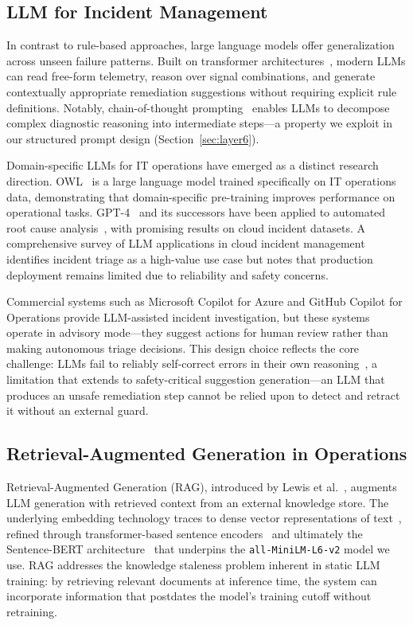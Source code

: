 \documentclass[a4paper,10pt,journal,compsoc]{IEEEtran}
\begin{document}
\subsection{LLM for Incident Management}

In contrast to rule-based approaches, large language models offer
generalization across unseen failure patterns. Built on transformer
architectures~\cite{vaswani2017attention,devlin2019bert}, modern LLMs
can read free-form telemetry, reason over signal combinations, and
generate contextually appropriate remediation suggestions without
requiring explicit rule definitions. Notably, chain-of-thought
prompting~\cite{wei2022cot} enables LLMs to decompose complex
diagnostic reasoning into intermediate steps---a property we exploit
in our structured prompt design (Section~\ref{sec:layer6}).

Domain-specific LLMs for IT operations have emerged as a distinct
research direction. OWL~\cite{guo2024owl} is a large language model
trained specifically on IT operations data, demonstrating that
domain-specific pre-training improves performance on operational tasks.
GPT-4~\cite{openai2023gpt4} and its successors have been applied to
automated root cause analysis~\cite{zhang2023automated}, with
promising results on cloud incident datasets. A comprehensive survey
of LLM applications in cloud incident management~\cite{zeng2023aiops}
identifies incident triage as a high-value use case but notes that
production deployment remains limited due to reliability and safety
concerns.

Commercial systems such as Microsoft Copilot for Azure and GitHub
Copilot for Operations provide LLM-assisted incident investigation,
but these systems operate in advisory mode---they suggest actions for
human review rather than making autonomous triage decisions. This
design choice reflects the core challenge: LLMs fail to reliably
self-correct errors in their own reasoning~\cite{huang2024selfcorrect},
a limitation that extends to safety-critical suggestion
generation---an LLM that produces an unsafe remediation step cannot be
relied upon to detect and retract it without an external guard.

\subsection{Retrieval-Augmented Generation in Operations}

Retrieval-Augmented Generation (RAG), introduced by Lewis et
al.~\cite{lewis2020rag}, augments LLM generation with retrieved
context from an external knowledge store. The underlying embedding
technology traces to dense vector representations of
text~\cite{mikolov2013word2vec}, refined through transformer-based
sentence encoders~\cite{devlin2019bert} and ultimately the
Sentence-BERT architecture~\cite{reimers2019sbert} that underpins the
\texttt{all-MiniLM-L6-v2} model we use. RAG addresses the knowledge
staleness problem inherent in static LLM training: by retrieving
relevant documents at inference time, the system can incorporate
information that postdates the model's training cutoff without
retraining.
\end{document}
